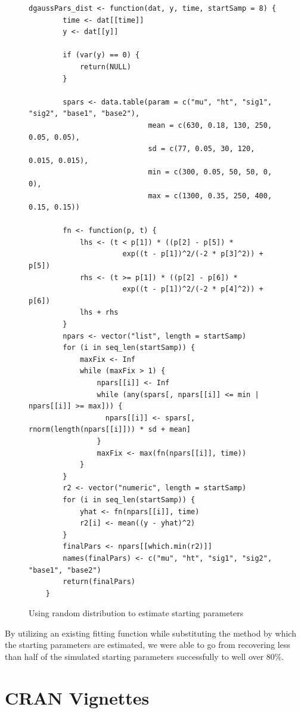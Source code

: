 \begin{singlespace}
\begin{figure}[H]
\centering
\begin{BVerbatim}
dgaussPars_dist <- function(dat, y, time, startSamp = 8) {
        time <- dat[[time]]
        y <- dat[[y]]
        
        if (var(y) == 0) {
            return(NULL)
        }
        
        spars <- data.table(param = c("mu", "ht", "sig1", "sig2", "base1", "base2"),
                            mean = c(630, 0.18, 130, 250, 0.05, 0.05), 
                            sd = c(77, 0.05, 30, 120, 0.015, 0.015), 
                            min = c(300, 0.05, 50, 50, 0, 0), 
                            max = c(1300, 0.35, 250, 400, 0.15, 0.15))
        
        fn <- function(p, t) {
            lhs <- (t < p[1]) * ((p[2] - p[5]) * 
                      exp((t - p[1])^2/(-2 * p[3]^2)) + p[5])
            rhs <- (t >= p[1]) * ((p[2] - p[6]) * 
                      exp((t - p[1])^2/(-2 * p[4]^2)) + p[6])
            lhs + rhs
        }
        npars <- vector("list", length = startSamp)
        for (i in seq_len(startSamp)) {
            maxFix <- Inf
            while (maxFix > 1) {
                npars[[i]] <- Inf
                while (any(spars[, npars[[i]] <= min | npars[[i]] >= max])) {
                  npars[[i]] <- spars[, rnorm(length(npars[[i]])) * sd + mean]
                }
                maxFix <- max(fn(npars[[i]], time))
            }
        }
        r2 <- vector("numeric", length = startSamp)
        for (i in seq_len(startSamp)) {
            yhat <- fn(npars[[i]], time)
            r2[i] <- mean((y - yhat)^2)
        }
        finalPars <- npars[[which.min(r2)]]
        names(finalPars) <- c("mu", "ht", "sig1", "sig2", "base1", "base2")
        return(finalPars)
    }
\end{BVerbatim}
\caption{Using random distribution to estimate starting parameters}
\label{fig:gauss_form_dist}
\end{figure}
\end{singlespace}

By utilizing an existing fitting function while substituting the method by which the starting parameters are estimated, we were able to go from recovering less than half of the simulated starting parameters successfully to well over 80\%.

\section{CRAN Vignettes}


